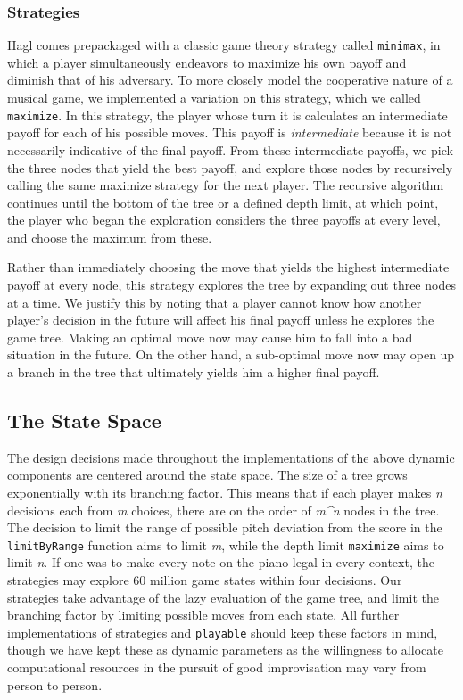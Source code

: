\documentclass{article}
\begin{document}
\subsubsection{Strategies}

Hagl comes prepackaged with a classic game theory strategy
called \texttt{minimax}, in which a player simultaneously endeavors to
maximize his own payoff and diminish that of his adversary. To more
closely model the cooperative nature of a musical game, we implemented a
variation on this strategy, which we called \texttt{maximize}. In this
strategy, the player whose turn it is calculates an intermediate payoff
for each of his possible moves. This payoff is \emph{intermediate} because it is
not necessarily indicative of the final payoff.  From these intermediate payoffs, we pick the three nodes that yield the best payoff, and explore those nodes by
recursively calling the same maximize strategy for the next player. The
recursive algorithm continues until the bottom of the tree or a defined
depth limit, at which point, the player who began the exploration
considers the three payoffs at every level, and choose the maximum from
these.

Rather than immediately choosing the move that yields the highest intermediate payoff at every node, this strategy explores the tree by expanding out three nodes at a time.  We justify this by noting that a player cannot know how another player's decision in the future will affect his final payoff unless he explores the game tree.  Making an optimal move now may cause him to fall into a bad situation in the future.  On the other hand, a sub-optimal move now may open up a branch in the tree that ultimately yields him a higher final payoff.

\subsection{The State Space}

The design decisions made throughout the implementations of the above
dynamic components are centered around the state space. The size of a
tree grows exponentially with its branching factor. This means that if
each player makes \emph{n} decisions each from \emph{m} choices,
there are on the order of \emph{m\^{}n} nodes in the tree. The decision
to limit the range of possible pitch deviation from the score in the
\texttt{limitByRange} function aims to limit \emph{m}, while the depth
limit \texttt{maximize} aims to limit \emph{n}. If one was to make
every note on the piano legal in every context, the strategies may
explore 60 million game states within four
decisions. Our strategies take advantage of the lazy
evaluation of the game tree, and limit the branching factor by
limiting possible moves from each state. All further implementations of
strategies and \texttt{playable} should keep these factors in mind,
though we have kept these as dynamic parameters as the
willingness to allocate computational resources in the pursuit of good
improvisation may vary from person to person.
\end{document}
